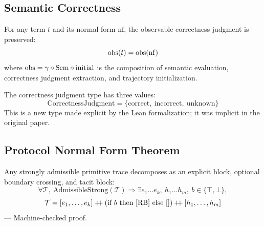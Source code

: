 \subsection{Semantic Correctness}

\begin{theorem}
For any term $t$ and its normal form $\mathrm{nf}$, the observable correctness
judgment is preserved:
\[
  \mathrm{obs}(t) = \mathrm{obs}(\mathrm{nf})
\]
where $\mathrm{obs} = \gamma \circ \mathrm{Sem} \circ \mathrm{initial}$ is the composition of
semantic evaluation, correctness judgment extraction, and trajectory initialization.
\end{theorem}

\begin{definition}
The correctness judgment type has three values:
\[
  \mathrm{CorrectnessJudgment} =
  \{\mathrm{correct},\ \mathrm{incorrect},\ \mathrm{unknown}\}
\]
This is a new type made explicit by the Lean formalization; it was implicit in
the original paper.
\end{definition}

\subsection{Protocol Normal Form Theorem}

\begin{theorem}
Any strongly admissible primitive trace decomposes as an explicit block,
optional boundary crossing, and tacit block:
\[
  \forall \mathcal{T},\
  \mathrm{AdmissibleStrong}(\mathcal{T})
  \Rightarrow
  \exists e_1\ldots e_k,\ h_1\ldots h_m,\ b \in \{\top, \bot\},
\]
\[
  \mathcal{T}
  = [e_1, \ldots, e_k]
    \mathbin{+\!\!+}
    (\text{if } b \text{ then } [\mathrm{RB}] \text{ else } [])
    \mathbin{+\!\!+}
    [h_1, \ldots, h_m]
\]
 ---
Machine-checked proof.
\end{theorem}
